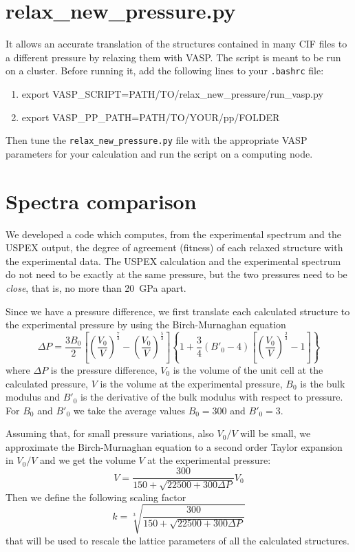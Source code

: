 \documentclass{article}
\begin{document}
\section{relax\_new\_pressure.py}
It allows an accurate translation of the structures contained in many CIF files to a different pressure by relaxing them with VASP. The script is meant to be run on a cluster. Before running it, add the following lines to your \texttt{.bashrc} file:
\begin{enumerate}
	\item export VASP\_SCRIPT=PATH/TO/relax\_new\_pressure/run\_vasp.py
	\item export VASP\_PP\_PATH=PATH/TO/YOUR/pp/FOLDER
\end{enumerate}
Then tune the \texttt{relax\_new\_pressure.py} file with the appropriate VASP parameters for your calculation and run the script on a computing node. 

\appendix
\appendixpage

\section{Spectra comparison}
\label{sec:spectracomp}

We developed a code which computes, from the experimental spectrum and the USPEX output, the degree of agreement (fitness) of each relaxed structure with the experimental data. The USPEX calculation and the experimental spectrum do not need to be exactly at the same pressure, but the two pressures need to be \emph{close}, that is, no more than \SI{20}{GPa} apart.

Since we have a pressure difference, we first translate each calculated structure to the experimental pressure by using the Birch-Murnaghan equation
\begin{equation*}
	\Delta P = \frac{3 B_0}{2} \left[ \left( \frac{V_0}{V} \right)^{\frac{7}{3}} - \left( \frac{V_0}{V} \right)^{\frac{5}{3}} \right] \left\{ 1 + \frac{3}{4} \left( B'_0 - 4 \right) \left[ \left( \frac{V_0}{V} \right)^{\frac{2}{3}} - 1 \right] \right\}
\end{equation*}
where $\Delta P$ is the pressure difference, $V_0$ is the volume of the unit cell at the calculated pressure, $V$ is the volume at the experimental pressure, $B_0$ is the bulk modulus and $B'_0$ is the derivative of the bulk modulus with respect to pressure. For $B_0$ and $B'_0$ we take the average values $B_0 = 300$ and $B'_0 = 3$. 

Assuming that, for small pressure variations, also $V_0/V$ will be small, we approximate the Birch-Murnaghan equation to a second order Taylor expansion in $V_0/V$ and we get the volume $V$ at the experimental pressure:
\begin{equation*}
	V = \frac{300}{150 + \sqrt{22500 + 300 \Delta P}} V_0
\end{equation*}
Then we define the following scaling factor
\begin{equation*}
	k = \sqrt[3]{\frac{300}{150 + \sqrt{22500 + 300 \Delta P}}}
\end{equation*}
that will be used to rescale the lattice parameters of all the calculated structures.
\end{document}
